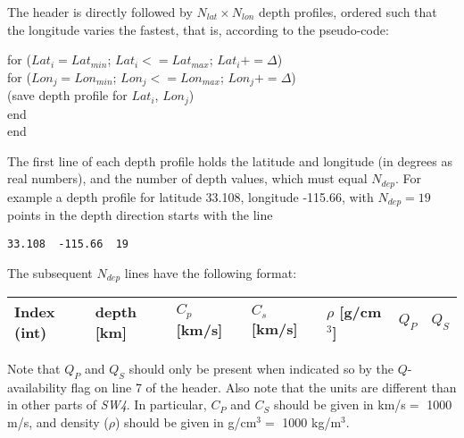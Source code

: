 \documentclass[11pt]{report}
\begin{document}
The header is directly followed by $N_{lat}\times N_{lon}$ depth profiles, ordered such that the longitude
varies the fastest, that is, according to the pseudo-code:
\begin{flushleft}
\hspace{10mm}  for ($Lat_i= Lat_{min}$; $Lat_i <= Lat_{max}$; $Lat_i += \Delta$)\\
\hspace{20mm}    for ($Lon_j= Lon_{min}$; $Lon_j <= Lon_{max}$; $Lon_j += \Delta$)\\
\hspace{30mm}      (save depth profile for $Lat_i$, $Lon_j$)\\
\hspace{20mm}    end\\
\hspace{10mm}  end
\end{flushleft}

The first line of each depth profile holds the latitude and longitude (in degrees as real
numbers), and the number of depth values, which must equal $N_{dep}$. For example a depth profile
for latitude 33.108, longitude -115.66, with $N_{dep}=19$ points in the depth direction starts with the line
\begin{verbatim}
33.108  -115.66  19
\end{verbatim}
The subsequent $N_{dep}$ lines have the following format:
\begin{center}
\begin{tabular}{lllllll}\hline
Index (int)& depth [km] & $C_p$ [km/s] &  $C_s$ [km/s] & $\rho$ [g/cm$^3$] & $Q_P$ & $Q_S$ \\ \hline
\end{tabular}
\end{center}
Note that $Q_P$ and $Q_S$ should only be present when indicated so by the $Q$-availability flag on
line 7 of the header. Also note that the units are different than in other parts of \emph{SW4}. In
particular, $C_P$ and $C_S$ should be given in km/s$=$ 1000 m/s, and density ($\rho$) should be
given in g/cm$^3=$ 1000 kg/m$^3$.
\end{document}
